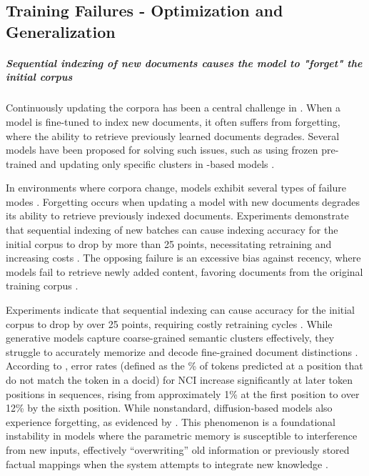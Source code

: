 \subsection{Training Failures - Optimization and Generalization}

\subparagraph{Sequential indexing of new documents causes the model to "forget" the initial corpus}
Continuously updating the corpora has been a central challenge in . When a model is fine-tuned to index new documents, it often suffers from forgetting, where the ability to retrieve previously learned documents degrades. Several models have been proposed for solving such issues, such as using frozen pre-trained  \cite{varsha-kishore-incdsi-incrementally,guo-corpusbrain-a} 
and updating only specific  clusters in -based models \cite{chen-continual-learning}.


In environments where corpora change,  models exhibit several types of failure modes \cite{chen-continual-learning,zhen-zhang-replication-and,peiwen-yuan-generative-dense,sanket-vaibhav-mehta-dsi-updating}.
Forgetting occurs when updating a model with new documents degrades its ability to retrieve previously indexed documents. Experiments demonstrate that sequential indexing of new batches can cause indexing accuracy for the initial corpus to drop by more than 25 points, necessitating retraining and increasing costs \cite{sanket-vaibhav-mehta-dsi-updating}. The opposing failure is an excessive bias against recency, where models fail to retrieve newly added content, favoring documents from the original training corpus \cite{zhen-zhang-replication-and}.

Experiments indicate that sequential indexing can cause accuracy for the initial corpus to drop by over 25 points, requiring costly retraining cycles  \cite{sanket-vaibhav-mehta-dsi-updating}. While generative models capture coarse-grained semantic clusters effectively, they struggle to accurately memorize and decode fine-grained document distinctions \cite{ye-wang-mindref-mimicking}. According to \citet{peiwen-yuan-generative-dense}, error rates (defined as the \% of tokens predicted at a position that do not match the  token in a docid) for NCI \cite{yujing-wang-a-neural} increase significantly at later token positions in  sequences, rising from approximately 1\% at the first position to over 12\% by the sixth position. While nonstandard, diffusion-based models also experience forgetting, as evidenced by \citet{xinpeng-zhao-diffugr-generative}. This phenomenon is a foundational instability in  models where the parametric memory is susceptible to interference from new inputs, effectively ``overwriting'' old information or previously stored factual mappings when the system attempts to integrate new knowledge \cite{zhen-zhang-replication-and}.

